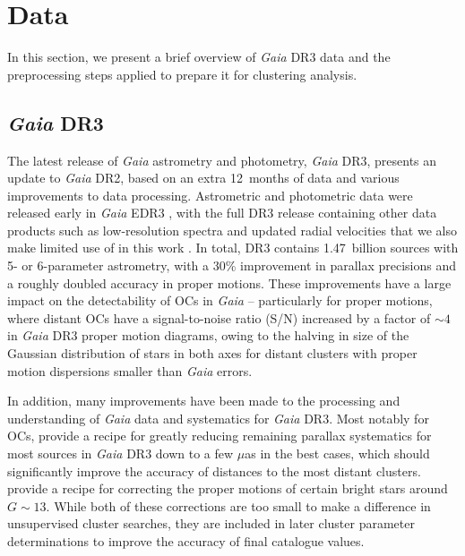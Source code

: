 \section{Data}\label{c3:sec:data}  %

In this section, we present a brief overview of \emph{Gaia} DR3 data and the preprocessing steps applied to prepare it for clustering analysis.

\subsection{\emph{Gaia} DR3}

The latest release of \emph{Gaia} \citep{gaia_collaboration_gaia_2016} astrometry and photometry, \emph{Gaia} DR3, presents an update to \emph{Gaia} DR2, based on an extra 12~months of data and various improvements to data processing. Astrometric and photometric data were released early in \emph{Gaia} EDR3 \citep{gaia_collaboration_gaia_2021}, with the full DR3 release containing other data products such as low-resolution spectra and updated radial velocities that we also make limited use of in this work \cite{gaia_collaboration_gaia_2022}. In total, DR3 contains 1.47~billion sources with 5- or 6-parameter astrometry, with a 30\% improvement in parallax precisions and a roughly doubled accuracy in proper motions. These improvements have a large impact on the detectability of OCs in \emph{Gaia} -- particularly for proper motions, where distant OCs have a signal-to-noise ratio (S/N) increased by a factor of $\sim4$ in \emph{Gaia} DR3 proper motion diagrams, owing to the halving in size of the Gaussian distribution of stars in both axes for distant clusters with proper motion dispersions smaller than \emph{Gaia} errors.

In addition, many improvements have been made to the processing and understanding of \emph{Gaia} data and systematics for \emph{Gaia} DR3. Most notably for OCs, \cite{lindegren_gaia_2021} provide a recipe for greatly reducing remaining parallax systematics for most sources in \emph{Gaia} DR3 down to a few $\mu$as in the best cases, which should significantly improve the accuracy of distances to the most distant clusters. \cite{cantat-gaudin_characterizing_2021} provide a recipe for correcting the proper motions of certain bright stars around $G\sim13$. While both of these corrections are too small to make a difference in unsupervised cluster searches, they are included in later cluster parameter determinations to improve the accuracy of final catalogue values.

